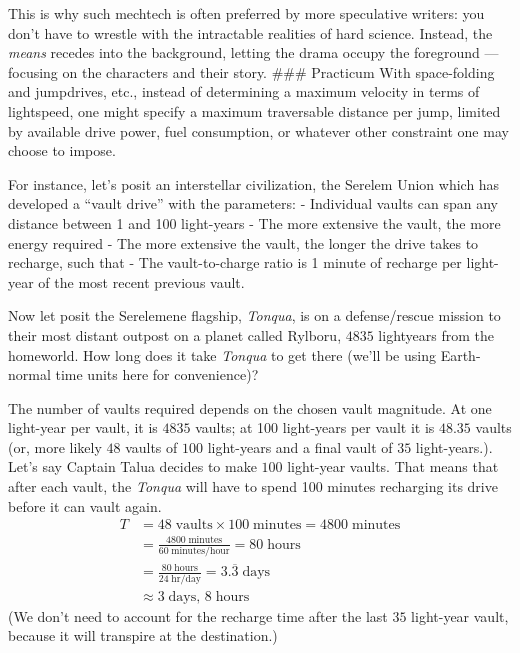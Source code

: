 \documentclass[
  letterpaper,
]{book}
\begin{document}
This is why such mechtech is often preferred by more speculative
writers: you don't have to wrestle with the intractable realities of
hard science. Instead, the \emph{means} recedes into the background,
letting the drama occupy the foreground --- focusing on the characters
and their story. \#\#\# Practicum With space-folding and jumpdrives,
etc., instead of determining a maximum velocity in terms of lightspeed,
one might specify a maximum traversable distance per jump, limited by
available drive power, fuel consumption, or whatever other constraint
one may choose to impose.

For instance, let's posit an interstellar civilization, the Serelem
Union which has developed a ``vault drive'' with the parameters: -
Individual vaults can span any distance between 1 and 100 light-years -
The more extensive the vault, the more energy required - The more
extensive the vault, the longer the drive takes to recharge, such that -
The vault-to-charge ratio is 1 minute of recharge per light-year of the
most recent previous vault.

Now let posit the Serelemene flagship, \emph{Tonqua}, is on a
defense/rescue mission to their most distant outpost on a planet called
Rylboru, \(4835\) lightyears from the homeworld. How long does it take
\emph{Tonqua} to get there (we'll be using Earth-normal time units here
for convenience)?

The number of vaults required depends on the chosen vault magnitude. At
one light-year per vault, it is \(4835\) vaults; at 100 light-years per
vault it is \(48.35\) vaults (or, more likely \(48\) vaults of \(100\)
light-years and a final vault of \(35\) light-years.). Let's say Captain
Talua decides to make \(100\) light-year vaults. That means that after
each vault, the \emph{Tonqua} will have to spend 100 minutes recharging
its drive before it can vault again. \[
\begin{align}
T &= 48\;\text{vaults} \times 100\;\text{minutes} = 4800\;\text{minutes} \\[0.5em]
&= \frac{4800\;\text{minutes}}{60\;\text{minutes/hour}} = 80\;\text{hours} \\[0.5em]
&= \frac{80\;\text{hours}}{24\;\text{hr/day}} = 3.\overline{3}\;\text{days} \\[0.5em]
&≈ 3\;\text{days, } 8\;\text{hours}
\end{align}
\] (We don't need to account for the recharge time after the last \(35\)
light-year vault, because it will transpire at the destination.)
\end{document}
